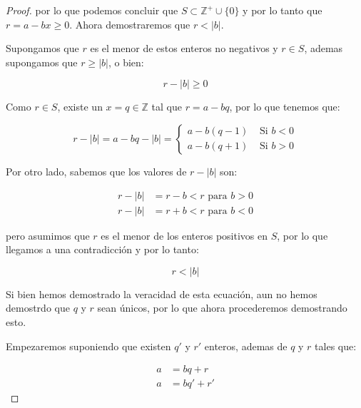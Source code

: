 \begin{proof}
            por lo que podemos concluir que $S \subset \mathbb{Z}^+ \cup \{0\}$ y por lo tanto que $r = a - bx \geq 0$.
            Ahora demostraremos que $r < |b|$.

            Supongamos que $r$ es el menor de estos enteros no negativos y $r \in S$, ademas supongamos que $r \geq |b|$, o bien:

            \begin{equation*}
                r - |b| \geq 0
            \end{equation*}

            Como $r \in S$, existe un $x = q \in \mathbb{Z}$ tal que $r = a - bq$, por lo que tenemos que:

            \begin{equation*}
                r - |b| = a - bq - |b| =
                \begin{cases}
                    a - b (q - 1) & \text{ Si } b < 0 \\
                    a - b (q + 1) & \text{ Si } b > 0 
                \end{cases}
            \end{equation*}

            Por otro lado, sabemos que los valores de $r - |b|$ son:

            \begin{align*}
                r - |b| &= r - b < r \text{ para } b > 0 \\
                r - |b| &= r + b < r \text{ para } b < 0
            \end{align*}

            pero asumimos que $r$ es el menor de los enteros positivos en $S$, por lo que llegamos a una contradicción y por lo tanto:

            \begin{equation*}
                r < |b|
            \end{equation*}

            Si bien hemos demostrado la veracidad de esta ecuación, aun no hemos demostrdo que $q$ y $r$ sean únicos, por lo que ahora procederemos demostrando esto.

            Empezaremos suponiendo que existen $q'$ y $r'$ enteros, ademas de $q$ y $r$ tales que:

            \begin{align*}
                a &= bq + r \\
                a &= bq' + r'
            \end{align*}


\end{proof}
